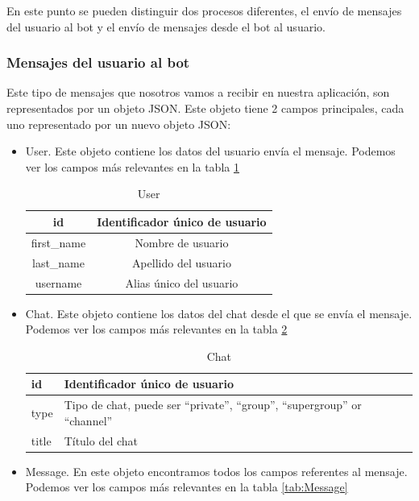 \documentclass[10pt,journal,compsoc]{IEEEtran}
\begin{document}
En este punto se pueden distinguir dos procesos diferentes, el envío de mensajes 
del usuario al bot y el envío de mensajes desde el bot al usuario.

\subsubsection{Mensajes del usuario al bot}
Este tipo de mensajes que nosotros vamos a recibir en nuestra aplicación, son 
representados por un objeto JSON. Este objeto tiene 2 campos principales, cada uno representado por
un nuevo objeto JSON:
\begin{itemize}
  \item User. Este objeto contiene los datos del usuario envía el mensaje.
 Podemos ver los campos más relevantes en la tabla \ref{tab:User}
  
  \begin{table}[h]
  \centering
  \begin{tabular}{cc}
  id  & Identificador único de usuario \\ \hline
  first\_name & Nombre de usuario \\ \hline
  last\_name & Apellido del usuario \\ \hline
  username & Alias único del usuario \\ \hline
  \end{tabular} 
  \caption{User}
  \label{tab:User}
  \end{table}

  \item Chat. Este objeto contiene los datos del chat desde el que se envía el 
  mensaje. Podemos ver los campos más relevantes en la tabla \ref{tab:Chat}
  
   \begin{table}[h]
  \centering
  \begin{tabular}{>{\centering\arraybackslash}m{1cm} >{\centering\arraybackslash}m{4cm}}
  id  & Identificador único de usuario \\ \hline
  type & Tipo de chat, puede ser “private”, “group”, “supergroup” or “channel” 
  \\ \hline
  title & Título del chat \\ \hline
  \end{tabular} 
  \caption{Chat}
  \label{tab:Chat}
  \end{table}
  
  \item Message. En este objeto encontramos todos los campos referentes al 
  mensaje. Podemos ver los campos más relevantes en la tabla \ref{tab:Message}
  

\end{itemize}
\end{document}
